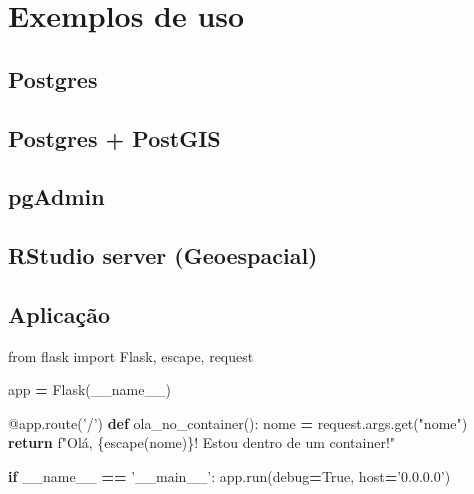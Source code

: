 \documentclass[]{article}
\newenvironment{Shaded}{\begin{snugshade}}{\end{snugshade}}
\newcommand{\AttributeTok}[1]{\textcolor[rgb]{0.77,0.63,0.00}{#1}}
\newcommand{\ControlFlowTok}[1]{\textcolor[rgb]{0.13,0.29,0.53}{\textbf{#1}}}
\newcommand{\ImportTok}[1]{#1}
\newcommand{\KeywordTok}[1]{\textcolor[rgb]{0.13,0.29,0.53}{\textbf{#1}}}
\newcommand{\NormalTok}[1]{#1}
\newcommand{\OperatorTok}[1]{\textcolor[rgb]{0.81,0.36,0.00}{\textbf{#1}}}
\newcommand{\SpecialCharTok}[1]{\textcolor[rgb]{0.00,0.00,0.00}{#1}}
\newcommand{\SpecialStringTok}[1]{\textcolor[rgb]{0.31,0.60,0.02}{#1}}
\newcommand{\StringTok}[1]{\textcolor[rgb]{0.31,0.60,0.02}{#1}}
\newcommand{\VariableTok}[1]{\textcolor[rgb]{0.00,0.00,0.00}{#1}}
\begin{document}
\hypertarget{exemplos-de-uso}{%
\section{Exemplos de uso}\label{exemplos-de-uso}}

\hypertarget{postgres}{%
\subsection{Postgres}\label{postgres}}

\hypertarget{postgres-postgis}{%
\subsection{Postgres + PostGIS}\label{postgres-postgis}}

\hypertarget{pgadmin}{%
\subsection{pgAdmin}\label{pgadmin}}

\hypertarget{rstudio-server-geoespacial}{%
\subsection{RStudio server (Geoespacial)}\label{rstudio-server-geoespacial}}

\hypertarget{aplicacao}{%
\subsection{Aplicação}\label{aplicacao}}

\begin{Shaded}
\begin{Highlighting}[]
\ImportTok{from}\NormalTok{ flask }\ImportTok{import}\NormalTok{ Flask, escape, request}

\NormalTok{app }\OperatorTok{=}\NormalTok{ Flask(}\VariableTok{__name__}\NormalTok{)}

\AttributeTok{@app.route}\NormalTok{(}\StringTok{'/'}\NormalTok{)}
\KeywordTok{def}\NormalTok{ ola_no_container():}
\NormalTok{    nome }\OperatorTok{=}\NormalTok{ request.args.get(}\StringTok{"nome"}\NormalTok{)}
    \ControlFlowTok{return} \SpecialStringTok{f"Olá, }\SpecialCharTok{\{}\NormalTok{escape(nome)}\SpecialCharTok{\}}\SpecialStringTok{! Estou dentro de um container!"}

\ControlFlowTok{if} \VariableTok{__name__} \OperatorTok{==} \StringTok{'__main__'}\NormalTok{:}
\NormalTok{    app.run(debug}\OperatorTok{=}\VariableTok{True}\NormalTok{, host}\OperatorTok{=}\StringTok{'0.0.0.0'}\NormalTok{)}
\end{Highlighting}
\end{Shaded}
\end{document}
